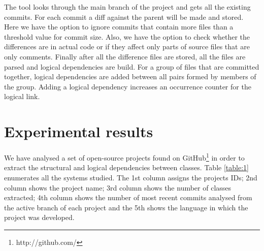 \documentclass[conference]{IEEEtran}
\begin{document}
The tool looks through the main branch of the project and gets all the existing commits. For each commit a diff against the parent will be made and stored. Here we have the option to ignore commits that contain more files than a threshold value for commit size. Also, we have the option to check whether the differences are in actual code or if they affect only parts of source files that are only comments.  Finally after all the difference files are stored, all the files are parsed and logical dependencies are build. For a group of files that are committed together, logical dependencies are added between all pairs formed by members of the group. Adding a logical dependency increases an occurrence counter for the logical link. 

\section{Experimental results}
\label{sec:experiments}


We have analysed a set of open-source projects found on GitHub\footnote{http://github.com/} in order to extract the structural and logical dependencies between classes. Table \ref{table:1} enumerates all the systems studied. The 1st column assigns the projects IDs; 2nd column shows the project name; 3rd column shows the number of classes extracted; 4th column shows the number of most recent commits analysed from the active branch of each project and the 5th shows the language in which the project was developed.
\end{document}
